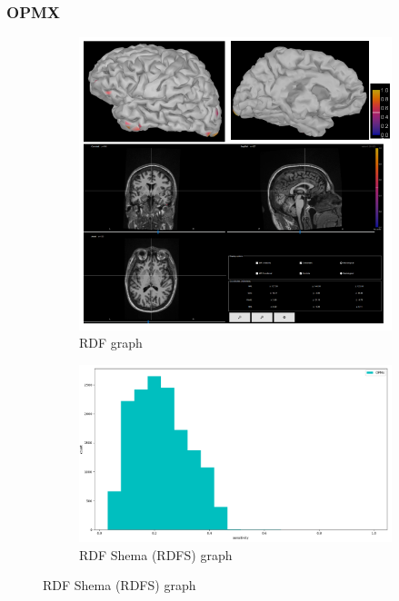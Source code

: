 \documentclass{beamer}
\numberwithin{figure}{section}
\numberwithin{equation}{section}
\begin{document}

\section{}
\begin{frame}
 \frametitle{OPMX}
  

 	\begin{figure}[h]
        \begin{subfigure}[h]{0.53\linewidth} 
            \includegraphics[width=\linewidth]{pictures/OPMX3}
            \caption{\tiny RDF graph}
            \label{fig:rdf_graph}
        \end{subfigure}       
        \begin{subfigure}[h]{0.45\linewidth} 
            \includegraphics[width=\linewidth]{pictures/opmx2}
            \caption{\tiny RDF Shema (RDFS) graph}
            \label{fig:rdfs_graph}
        \end{subfigure}
    \end{figure}

  
\end{frame}
\end{document}
